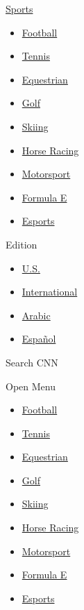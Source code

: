 \href{/sport}{Sports}

\begin{itemize}
\tightlist
\item
  \href{/sport/football}{Football}
\item
  \href{/sport/tennis}{Tennis}
\item
  \href{/sport/equestrian}{Equestrian}
\item
  \href{/sport/golf}{Golf}
\item
  \href{/sport/skiing}{Skiing}
\item
  \href{/sport/horse-racing}{Horse Racing}
\item
  \href{/sport/motorsport}{Motorsport}
\item
  \href{/specials/sport/formula-e}{Formula E}
\item
  \href{/specials/esports}{Esports}
\end{itemize}

Edition

\begin{itemize}
\tightlist
\item
  \href{//us.cnn.com?hpt=header_edition-picker}{U.S.}
\item
  \href{//edition.cnn.com?hpt=header_edition-picker}{International}
\item
  \href{//arabic.cnn.com?hpt=header_edition-picker}{Arabic}
\item
  \href{//cnnespanol.cnn.com?hpt=header_edition-picker}{Español}
\end{itemize}

Search CNN

Open Menu

\begin{itemize}
\tightlist
\item
  \href{/sport/football}{Football}
\item
  \href{/sport/tennis}{Tennis}
\item
  \href{/sport/equestrian}{Equestrian}
\item
  \href{/sport/golf}{Golf}
\item
  \href{/sport/skiing}{Skiing}
\item
  \href{/sport/horse-racing}{Horse Racing}
\item
  \href{/sport/motorsport}{Motorsport}
\item
  \href{/specials/sport/formula-e}{Formula E}
\item
  \href{/specials/esports}{Esports}
\end{itemize}

